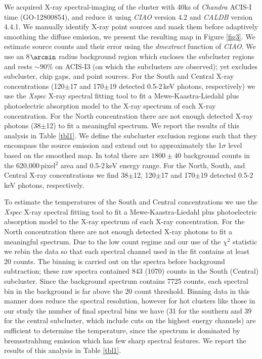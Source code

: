 We acquired X-ray spectral-imaging of the cluster with 40ks of {\it Chandra} ACIS-I time (GO-12800854), and reduce it using \emph{CIAO} version 4.2 and \emph{CALDB} version 4.4.1.
We manually identify X-ray point sources and mask them before adaptively smoothing the diffuse emission, we present the resulting map in Figure \ref{fig3}.
We estimate source counts and their error using the \emph{dmextract} function of \emph{CIAO}.
We use an 8$\arcmin$ radius background region which encloses the subcluster regions and rests $\sim90\%$ on ACIS-I3 (on which the subclusters are observed); yet excludes subcluster, chip gaps, and point sources.
For the South and Central X-ray concentrations (120$\pm$17 and 170$\pm$19 detected 0.5-2\,keV photons, respectively) we use the \emph{Xspec} X-ray spectral fitting tool \citep{arna96} to fit a Mewe-Kaastra-Liedahl plus photoelectric absorption model \citep[fixed to the Leiden/Argentine/Bonn value;][]{kalb05} to the X-ray spectrum of each X-ray concentration.
For the North concentration there are not enough detected X-ray photons (38$\pm$12) to fit a meaningful spectrum.  
We report the results of this analysis in Table \ref{tbl1}. 
We define the subcluster exclusion regions such that they encompass the source emission and extend out to approximately the 1$\sigma$ level based on the smoothed map.  
In total there are $1800\pm40$ background counts in the 620,000\,pixel$^2$ area and 0.5-2\,keV energy range.
For the North, South, and Central X-ray concentrations we find 38$\pm$12, 120$\pm$17 and 170$\pm$19 detected 0.5-2\,keV photons, respectively.   
 
To estimate the temperatures of the South and Central concentrations we use the \emph{Xspec} X-ray spectral fitting tool \citep{arna96} to fit a Mewe-Kaastra-Liedahl plus photoelectric absorption model \citep[fixed to the Leiden/Argentine/Bonn value;][]{kalb05} to the X-ray spectrum of each X-ray concentration.  
For the North concentration there are not enough detected X-ray photons to fit a meaningful spectrum.  
Due to the low count regime and our use of the $\chi^2$ statistic we rebin the data so that each spectral channel used in the fit contains at least 20 counts.
The binning is carried out on the spectra before background subtraction; these raw spectra contained 843 (1070) counts in the South (Central) subcluster.
Since the background spectrum contains 7725 counts, each spectral bin in the background is far above the 20 count threshold.
Binning data in this manner does reduce the spectral resolution, however for hot clusters like those in our study the number of final spectral bins we have (31 for the southern and 39 for the central subcluster, which include cuts on the highest energy channels) are sufficient to determine the temperature, since the spectrum is dominated by bremsstrahlung emission which has few sharp spectral features. 
We report the results of this analysis in Table \ref{tbl1}.

